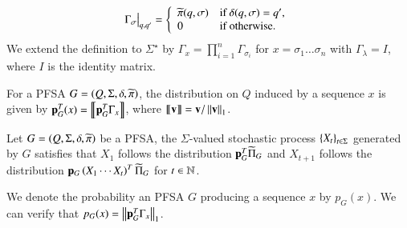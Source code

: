 \documentclass[9pt,journal,compsoc]{IEEEtran}
\begin{document}
{\begin{defn}
\begin{gather}
       \Gamma_\sigma\big|_{q, q'} = \left\{
         \begin{array}{ll}
           \widetilde{\pi}(q, \sigma) & \textrm{if } \delta(q, \sigma) = q',\\
           0 & \textrm{if otherwise}.
         \end{array}\right.
     \end{gather}%
     We extend the definition to $\Sigma^{\star}$ by $\Gamma_x=\prod^{n}_{i=1}\Gamma_{\sigma_i}$ for $x = \sigma_1\dots \sigma_n$ with $\Gamma_{\lambda} = I$, where $I$ is the identity matrix.
   \end{defn}
   \begin{defn}
     \label{defn:InducedDistr}
     For a PFSA $G = \left( Q, \Sigma, \delta, \widetilde{\pi} \right)$, the distribution on $Q$ induced by a sequence $x$ is given by $\mathbf{p}^{T}_{G}(x) = \left\llbracket{\mathbf{p}_G^{T}\Gamma_{x}}\right\rrbracket$, where $\left\llbracket{\mathbf{v}}\right\rrbracket = \mathbf{v}/\left\Vert \mathbf{v} \right\Vert_1$. 
   \end{defn}
   \begin{defn}
     \label{defn:StochasticpocessOfPFSA}
     Let $G=\left( Q, \Sigma, \delta, \widetilde{\pi} \right)$ be a PFSA, the $\Sigma$-valued stochastic process $\left\{ X_t \right\}_{t\in\Sigma}$ generated by $G$ satisfies that $X_1$ follows the distribution $\mathbf{p}_G^T\widetilde{\Pi}_{G}$ and $X_{t+1}$ follows the distribution $\mathbf{p}_{G}\left( X_{1}\cdots X_{t} \right)^T\widetilde{\Pi}_{G}$ for $t\in\mathbb{N}$.
   \end{defn}
   We denote the probability an PFSA $G$ producing a sequence $x$ by $p_{G}(x)$. We can verify that $p_{G}(x) = \left\Vert \mathbf{p}_{G}^T\Gamma_x \right\Vert_1$.


}
\end{document}
